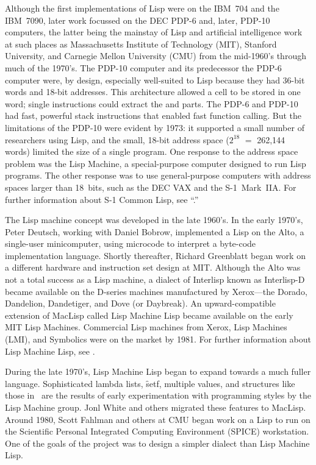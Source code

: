 Although the first implementations of Lisp were on the IBM~704 and the
IBM~7090, later work focussed on the DEC
PDP-6 and, later, PDP-10 computers, the latter being the mainstay of
Lisp and artificial intelligence work at such places as 
Massachusetts Institute of Technology (MIT), Stanford University,
and 
Carnegie Mellon University (CMU) from the mid-1960's through much of the 1970's.
The PDP-10 computer and its predecessor the PDP-6 computer were, by
design, especially well-suited to Lisp because they had 36-bit words
and 18-bit addresses. This architecture allowed a  cell to be
stored in one word; single instructions could extract the 
 and 
parts.  The PDP-6 and PDP-10 had fast, powerful stack instructions
that enabled fast function calling.
But the limitations of the PDP-10 were evident by 1973: it supported a
small number of researchers using Lisp, and the small, 18-bit address
space ($2^{18}$ $=$ 262,144 words) limited the size of a single
program.
One response to the address space problem was the Lisp Machine, a
special-purpose computer designed to run Lisp programs.  The other
response was to use general-purpose computers with address spaces
larger than 18~bits, such as the DEC VAX and
the \hbox{S-1}~Mark~IIA.
For further information about S-1 Common Lisp, see ``{\SOneCLPaper}.''
 
The Lisp machine concept was developed in the late 1960's.  In the
early 1970's, Peter Deutsch, working with 
Daniel Bobrow, implemented a Lisp on the
Alto, a single-user minicomputer, using microcode to interpret a
byte-code implementation language. Shortly thereafter, Richard
Greenblatt began work on a different hardware and instruction set
design at MIT.
Although the Alto was not a total success as a Lisp machine, a dialect
of Interlisp known as Interlisp-D became available on the D-series
machines manufactured by Xerox---the Dorado, Dandelion,
Dandetiger, and Dove (or Daybreak).
An upward-compatible extension of MacLisp called Lisp
Machine Lisp became available on the early MIT Lisp Machines.
Commercial Lisp machines from Xerox, Lisp Machines (LMI), and
Symbolics were on the market by 1981.
For further information about Lisp Machine Lisp, see {\Chinual}.
 
During the late 1970's, Lisp Machine Lisp began to expand towards a
much fuller language.  Sophisticated lambda lists, 
\f{setf}, multiple values, and structures
like those in \clisp\ are the results of early
experimentation with programming styles by the Lisp Machine group.
Jonl White and others migrated these features to MacLisp.
Around 1980, Scott Fahlman and others at CMU began work on a Lisp to
run on the Scientific Personal Integrated Computing
Environment (SPICE) workstation.  One of the goals of the project was to
design a simpler dialect than Lisp Machine Lisp.
 
